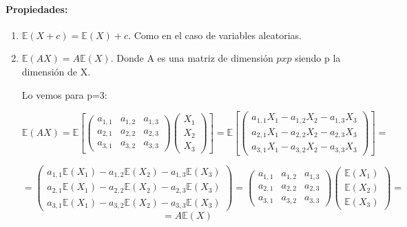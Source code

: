 \paragraph{Propiedades:}
\begin{enumerate}
\item $\mathbb{E}(X+c) = \mathbb{E}(X)+c$. Como en el caso de variables aleatorias.
\item $\mathbb{E}(AX) = A\mathbb{E}(X)$. Donde A es una matriz de dimensión $pxp$ siendo p la dimensión de X.

Lo vemos para p=3:

\[
\mathbb{E}(AX)=
\mathbb{E}\left[
\left(
\begin{array}{ccc}
a_{1,1}& a_{1,2}& a_{1,3}\\
a_{2,1}& a_{2,2}& a_{2,3}\\
a_{3,1}& a_{3,2}& a_{3,3}
\end{array}
\right)
\left(
\begin{array}{c}
X_1\\
X_2\\
X_3
\end{array}
\right) \right]=
\mathbb{E}\left[
\left(
\begin{array}{c}
a_{1,1}X_1 - a_{1,2}X_2 - a_{1,3}X_3\\
a_{2,1}X_1 - a_{2,2}X_2 - a_{2,3}X_3\\
a_{3,1}X_1 - a_{3,2}X_2 - a_{3,3}X_3
\end{array}
\right)
\right]=
\]

\[
=\left(
\begin{array}{c}
a_{1,1}\mathbb{E}(X_1) - a_{1,2}\mathbb{E}(X_2) - a_{1,3}\mathbb{E}(X_3)\\
a_{2,1}\mathbb{E}(X_1) - a_{2,2}\mathbb{E}(X_2) - a_{2,3}\mathbb{E}(X_3)\\
a_{3,1}\mathbb{E}(X_1) - a_{3,2}\mathbb{E}(X_2) - a_{3,3}\mathbb{E}(X_3)
\end{array}
\right)=
\left(
\begin{array}{ccc}
a_{1,1}& a_{1,2}& a_{1,3}\\
a_{2,1}& a_{2,2}& a_{2,3}\\
a_{3,1}& a_{3,2}& a_{3,3}
\end{array}
\right)
\left(
\begin{array}{c}
\mathbb{E}(X_1)\\
\mathbb{E}(X_2)\\
\mathbb{E}(X_3)
\end{array}
\right)=
\]
\[
=A\mathbb{E}(X)
\]

\end{enumerate}


